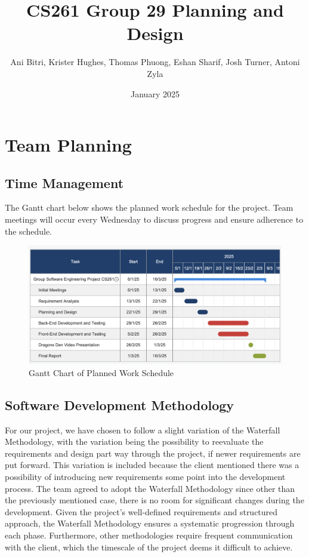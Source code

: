 \documentclass{article}
\title{CS261 Group 29 Planning and Design}
\author{Ani Bitri, Krister Hughes, Thomas Phuong, Eshan Sharif, Josh Turner, Antoni Zyla}
\date{January 2025}
\begin{document}
\maketitle


\section{Team Planning}
\subsection{Time Management}
The Gantt chart below shows the planned work schedule for the project. Team meetings will occur every Wednesday to discuss progress and ensure adherence to the schedule.

\begin{figure}[H]
    \centering
    \includegraphics[width=\textwidth]{ganttchart.png}
    \caption{Gantt Chart of Planned Work Schedule}
    \label{fig:gantt_chart}
\end{figure}

\subsection{Software Development Methodology}
For our project, we have chosen to follow a slight variation of the Waterfall Methodology, with the variation 
being the possibility to reevaluate the requirements and design part way through the project, if newer 
requirements are put forward. This variation is included because the client mentioned there was a possibility 
of introducing new requirements some point into the development process. The team agreed to adopt the Waterfall 
Methodology since other than the previously mentioned case, there is no room for significant changes during the 
development. Given the project's well-defined requirements and structured approach, the Waterfall Methodology 
ensures a systematic progression through each phase. Furthermore, other methodologies require frequent communication 
with the client, which the timescale of the project deems it difficult to achieve.
\end{document}
